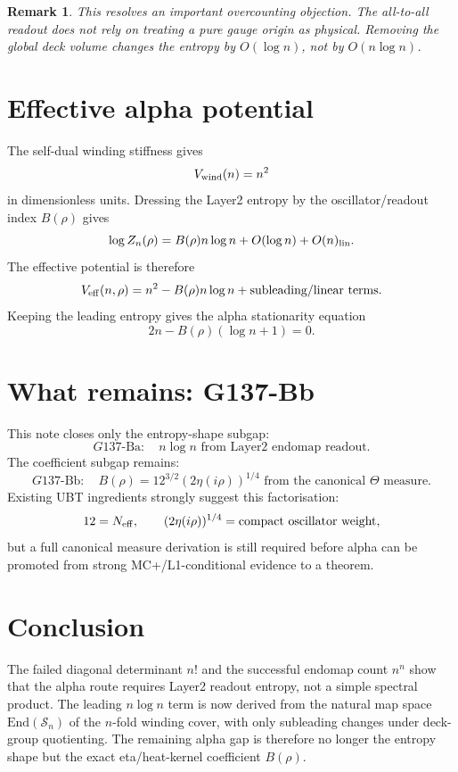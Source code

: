 \documentclass[12pt,a4paper]{article}
\newtheorem{remark}[definition]{Remark}
\begin{document}
\begin{remark}
This resolves an important overcounting objection.  The all-to-all readout does
not rely on treating a pure gauge origin as physical.  Removing the global deck
volume changes the entropy by $O(\log n)$, not by $O(n\log n)$.
\end{remark}

\section{Effective alpha potential}

The self-dual winding stiffness gives
\[
  V_{\rm wind}(n)=n^2
\]
in dimensionless units.  Dressing the Layer2 entropy by the oscillator/readout
index $B(\rho)$ gives
\[
  \log Z_n(\rho)=B(\rho)n\log n+O(\log n)+O(n)_{\rm lin}.
\]
The effective potential is therefore
\[
  V_{\rm eff}(n,\rho)=n^2-B(\rho)n\log n+\text{subleading/linear terms}.
\]
Keeping the leading entropy gives the alpha stationarity equation
\[
  2n-B(\rho)(\log n+1)=0.
\]

\section{What remains: G137-Bb}

This note closes only the entropy-shape subgap:
\[
  \boxed{G137\text{-Ba}:\quad n\log n\text{ from Layer2 endomap readout}.}
\]
The coefficient subgap remains:
\[
  \boxed{G137\text{-Bb}:\quad
  B(\rho)=12^{3/2}(2\eta(i\rho))^{1/4}
  \text{ from the canonical }\Theta\text{ measure}.}
\]
Existing UBT ingredients strongly suggest this factorisation:
\[
  12=N_{\rm eff},
  \qquad
  (2\eta(i\rho))^{1/4}=\text{compact oscillator weight},
\]
but a full canonical measure derivation is still required before alpha can be
promoted from strong MC+/L1-conditional evidence to a theorem.

\section{Conclusion}

The failed diagonal determinant $n!$ and the successful endomap count $n^n$ show
that the alpha route requires Layer2 readout entropy, not a simple spectral
product.  The leading $n\log n$ term is now derived from the natural map space
$\mathrm{End}(\mathcal S_n)$ of the $n$-fold winding cover, with only subleading
changes under deck-group quotienting.  The remaining alpha gap is therefore no
longer the entropy shape but the exact eta/heat-kernel coefficient $B(\rho)$.
\end{document}
